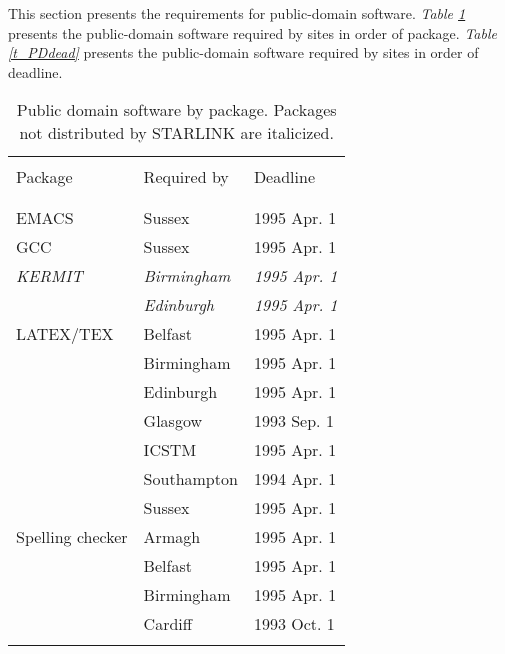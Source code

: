 This section presents the requirements for public-domain software.
{\em Table \ref{t_PDpack}} presents the public-domain software required by 
sites in order of package.
{\em Table \ref{t_PDdead}} presents the public-domain software required by 
sites in order of deadline.

\begin{table}
\begin{center}
\caption{Public domain software by package.
Packages not distributed by STARLINK are italicized.}
\vspace{5mm}
\begin{tabular}{|p{36mm}|p{50mm}|p{30mm}|} \hline \label{t_PDpack}
& & \\
Package & Required by & Deadline \\
& & \\ \hline
& & \\
EMACS            & Sussex           & 1995 Apr. 1 \\
GCC              & Sussex           & 1995 Apr. 1 \\
{\em KERMIT}     & {\em Birmingham} & {\em 1995 Apr. 1} \\
                 & {\em Edinburgh}  & {\em 1995 Apr. 1} \\
LATEX/TEX        & Belfast          & 1995 Apr. 1 \\
                 & Birmingham       & 1995 Apr. 1 \\
                 & Edinburgh        & 1995 Apr. 1 \\
                 & Glasgow          & 1993 Sep. 1 \\
                 & ICSTM            & 1995 Apr. 1 \\
                 & Southampton      & 1994 Apr. 1 \\
                 & Sussex           & 1995 Apr. 1 \\
Spelling checker & Armagh           & 1995 Apr. 1 \\
                 & Belfast          & 1995 Apr. 1 \\
                 & Birmingham       & 1995 Apr. 1 \\
                 & Cardiff          & 1993 Oct. 1 \\
& & \\ \hline
\end{tabular}
\end{center}
\end{table}


